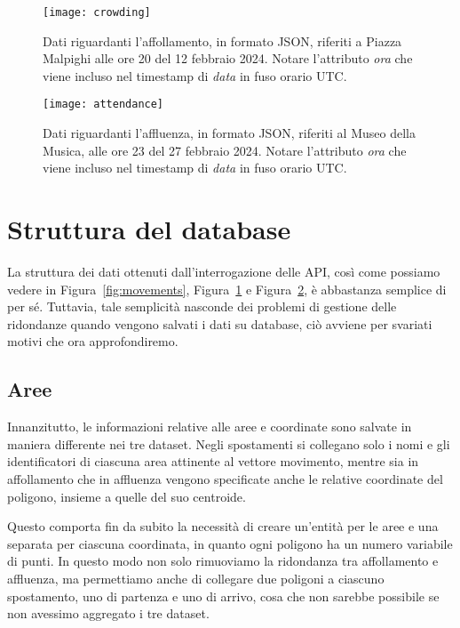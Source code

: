 \begin{figure}[H]
    \centering
    \texttt{[image: crowding]}
    \caption[Struttura dei dati sull'affollamento]{Dati riguardanti l'affollamento, in formato JSON, riferiti a Piazza Malpighi alle ore 20 del 12 febbraio 2024. Notare l'attributo \textit{ora} che viene incluso nel timestamp di \textit{data} in fuso orario UTC.}
    \label{fig:crowding}
\end{figure}

\begin{figure}[H]
    \centering
    \texttt{[image: attendance]}
    \caption[Struttura dei dati sull'affluenza]{Dati riguardanti l'affluenza, in formato JSON, riferiti al Museo della Musica, alle ore 23 del 27 febbraio 2024. Notare l'attributo \textit{ora} che viene incluso nel timestamp di \textit{data} in fuso orario UTC.}
    \label{fig:attendance}
\end{figure}

\section{Struttura del database}
La struttura dei dati ottenuti dall'interrogazione delle API, così come possiamo vedere in Figura~\ref{fig:movements}, Figura~\ref{fig:crowding} e Figura~\ref{fig:attendance}, è abbastanza semplice di per sé. Tuttavia, tale semplicità nasconde dei problemi di gestione delle ridondanze quando vengono salvati i dati su database, ciò avviene per svariati motivi che ora approfondiremo.

\subsection{Aree}
Innanzitutto, le informazioni relative alle aree e coordinate sono salvate in maniera differente nei tre dataset. Negli spostamenti si collegano solo i nomi e gli identificatori di ciascuna area attinente al vettore movimento, mentre sia in affollamento che in affluenza vengono specificate anche le relative coordinate del poligono, insieme a quelle del suo centroide.

Questo comporta fin da subito la necessità di creare un'entità per le aree e una separata per ciascuna coordinata, in quanto ogni poligono ha un numero variabile di punti. In questo modo non solo rimuoviamo la ridondanza tra affollamento e affluenza, ma permettiamo anche di collegare due poligoni a ciascuno spostamento, uno di partenza e uno di arrivo, cosa che non sarebbe possibile se non avessimo aggregato i tre dataset.

